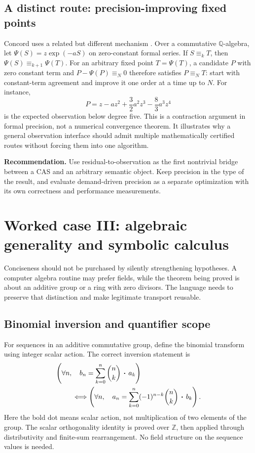 \documentclass[11pt,letterpaper]{article}
\newcommand{\Z}{\mathbb Z}
\newcommand{\Q}{\mathbb Q}
\newcommand{\decision}[1]{\par\smallskip\textbf{Recommendation.} #1\par\smallskip}
\begin{document}
\subsection{A distinct route: precision-improving fixed points}
Concord uses a related but different mechanism \cite[\S7.3]{concord}. Over a commutative
\(\Q\)-algebra, let \(\Psi(S)=z\exp(-aS)\) on zero-constant formal series.
If \(S\equiv_kT\), then \(\Psi(S)\equiv_{k+1}\Psi(T)\). For an arbitrary
fixed point \(T=\Psi(T)\), a candidate \(P\) with zero constant term and
\(P-\Psi(P)\equiv_N0\) therefore satisfies \(P\equiv_NT\): start with
constant-term agreement and improve it one order at a time up to \(N\).
For instance,
\[
 P=z-az^2+\frac32a^2z^3-\frac83a^3z^4
\]
is the expected observation below degree five. This is a contraction argument
in formal precision, not a numerical convergence theorem. It illustrates why a
general observation interface should admit multiple mathematically certified
routes without forcing them into one algorithm.

\decision{Use residual-to-observation as the first nontrivial bridge between a
CAS and an arbitrary semantic object. Keep precision in the type of the result,
and evaluate demand-driven precision as a separate optimization with its own
correctness and performance measurements.}

\section{Worked case III: algebraic generality and symbolic calculus}\label{sec:generality}
Conciseness should not be purchased by silently strengthening hypotheses. A
computer algebra routine may prefer fields, while the theorem being proved is
about an additive group or a ring with zero divisors. The language needs to
preserve that distinction and make legitimate transport reusable.

\subsection{Binomial inversion and quantifier scope}
For sequences in an additive commutative group, define the binomial transform
using integer scalar action. The correct inversion statement is
\begin{align*}
 &\left(\forall n,\quad b_n=\sum_{k=0}^n\binom nk\,\boldsymbol{\cdot}\,a_k\right)\\
 &\hspace{.35in}\Longleftrightarrow
 \left(\forall n,\quad a_n=\sum_{k=0}^n
       (-1)^{n-k}\binom nk\,\boldsymbol{\cdot}\,b_k\right).
\end{align*}
Here the bold dot means scalar action, not multiplication of two elements of the
group. The scalar orthogonality identity is proved over \(\Z\), then applied
through distributivity and finite-sum rearrangement. No field structure on the
sequence values is needed.
\end{document}

